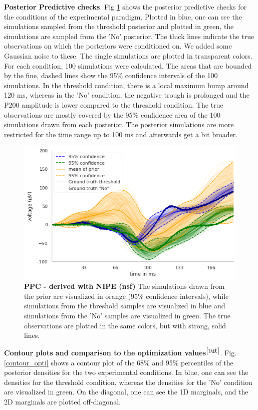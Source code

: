 \documentclass[12pt]{extreport}
\begin{document}
\textbf{Posterior Predictive checks}. Fig \ref{exp_ppc} shows the posterior predictive checks for the conditions of the experimental paradigm. Plotted in blue, one can see the simulations sampled from the threshold posterior and plotted in green, the simulations are sampled from the 'No' posterior. The thick lines indicate the true observations on which the posteriors were conditioned on. We added some Gaussian noise to these. The single simulations are plotted in transparent colors. For each condition, 100 simulations were calculated. The areas that are bounded by the fine, dashed lines show the 95\% confidence intervals of the 100 simulations. In the threshold condition, there is a local maximum bump around 120 ms, whereas in the 'No' condition, the negative trough is prolonged and the P200 amplitude is lower compared to the threshold condition. 
The true observations are mostly covered by the 95\% confidence area of the 100 simulations drawn from each posterior. The posterior simulations are more restricted for the time range up to 100 ms and afterwards get a bit broader.


 \begin{figure}[!ht]
 \centering


        \includegraphics[width=0.70\linewidth]{images/ppc_threshold_versus_No_nipe.png}


\caption{\label{exp_ppc}\textbf{PPC - derived with NIPE (nsf)} \small The simulations drawn from the prior are visualized in orange (95\% confidence intervals), while simulations from the threshold samples are visualized in blue and simulations from the 'No' samples are visualized in green. The true observations are plotted in the same colors, but with strong, solid lines.}

\end{figure}


\textbf{Contour plots and comparison to the optimization values$^{\ref{tut}}$}. Fig.\ref{contour_opti} shows a contour plot of the 68\% and 95\% percentiles of the posterior densities for the two experimental conditions. In blue, one can see the densities for the threshold condition, whereas the densities for the 'No' condition are visualized in green. On the diagonal, one can see the 1D marginals, and the 2D marginals are plotted off-diagonal. 
\end{document}
